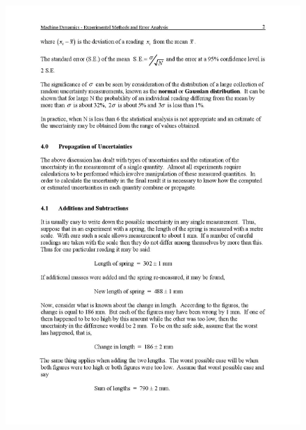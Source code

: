 \documentclass[12pt,a4paper]{report}
\begin{document}
\begin{figure}
  \includegraphics[width=\linewidth]{error/e2}
  \caption*{}
\label{}
\end{figure}
\end{document}
